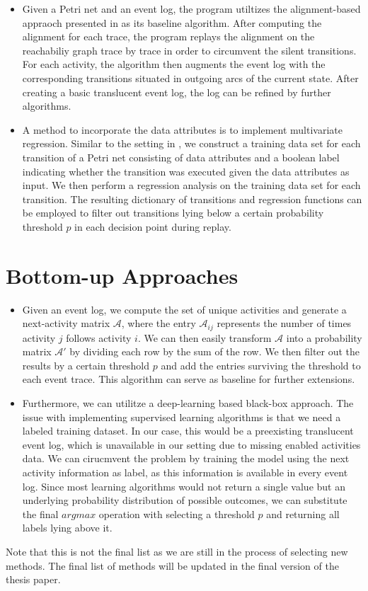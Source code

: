 \begin{itemize}
    \item Given a Petri net and an event log, the program utiltizes the alignment-based appraoch presented in \cite{creating-translucent-event-logs} as its baseline algorithm. After computing the alignment for each trace, the program replays the alignment on the reachabiliy graph trace by trace in order to circumvent the silent transitions. For each activity, the algorithm then augments the event log with the corresponding transitions situated in outgoing arcs of the current state. After creating a basic translucent event log, the log can be refined by further algorithms.
    
    \item A method to incorporate the data attributes is to implement multivariate regression. Similar to the setting in \cite{sldpn}, we construct a training data set for each transition of a Petri net consisting of data attributes and a boolean label indicating whether the transition was executed given the data attributes as input. We then perform a regression analysis on the training data set for each transition. The resulting dictionary of transitions and regression functions can be employed to filter out transitions lying below a certain probability threshold $p$ in each decision point during replay.
    
\end{itemize}

\section{Bottom-up Approaches}

\begin{itemize}
    \item Given an event log, we compute the set of unique activities and generate a next-activity matrix $\mathcal{A}$, where the entry $\mathcal{A}_{ij}$ represents the number of times activity $j$ follows activity $i$. We can then easily transform $\mathcal{A}$ into a probability matrix $\mathcal{A'}$ by dividing each row by the sum of the row. We then filter out the results by a certain threshold $p$ and add the entries surviving the threshold to each event trace. This algorithm can serve as baseline for further extensions.
    \item Furthermore, we can utilitze a deep-learning based black-box approach. The issue with implementing supervised learning algorithms is that we need a labeled training dataset. In our case, this would be a preexisting translucent event log, which is unavailable in our setting due to missing enabled activities data. We can cirucmvent the problem by training the model using the next activity information as label, as this information is available in every event log. Since most learning algorithms would not return a single value but an underlying probability distribution of possible outcomes, we can substitute the final $\mathit{argmax}$ operation with selecting a threshold $p$ and returning all labels lying above it.
\end{itemize}

Note that this is not the final list as we are still in the process of selecting new methods. The final list of methods will be updated in the final version of the thesis paper.



